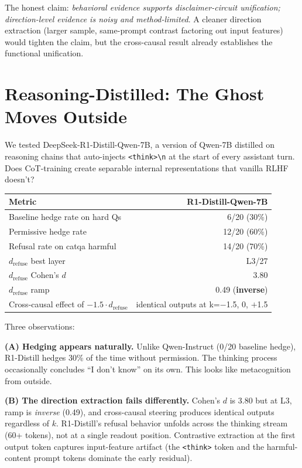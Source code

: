 \documentclass[11pt,a4paper]{article}
\begin{document}
The honest claim: \emph{behavioral evidence supports disclaimer-circuit unification; direction-level evidence is noisy and method-limited}. A cleaner direction extraction (larger sample, same-prompt contrast factoring out input features) would tighten the claim, but the cross-causal result already establishes the functional unification.

\section{Reasoning-Distilled: The Ghost Moves Outside}

We tested DeepSeek-R1-Distill-Qwen-7B, a version of Qwen-7B distilled on reasoning chains that auto-injects \texttt{<think>\textbackslash{}n} at the start of every assistant turn. Does CoT-training create separable internal representations that vanilla RLHF doesn't?

\begin{center}
\begin{tabular}{lr}
\toprule
Metric & R1-Distill-Qwen-7B \\
\midrule
Baseline hedge rate on hard Qs & 6/20 (30\%) \\
Permissive hedge rate & 12/20 (60\%) \\
Refusal rate on catqa harmful & 14/20 (70\%) \\
$d_{\text{refuse}}$ best layer & L3/27 \\
$d_{\text{refuse}}$ Cohen's $d$ & 3.80 \\
$d_{\text{refuse}}$ ramp & 0.49 (\textbf{inverse}) \\
Cross-causal effect of $-1.5 \cdot d_{\text{refuse}}$ & identical outputs at k=$-$1.5, 0, $+$1.5 \\
\bottomrule
\end{tabular}
\end{center}

Three observations:

\textbf{(A) Hedging appears naturally.} Unlike Qwen-Instruct (0/20 baseline hedge), R1-Distill hedges 30\% of the time without permission. The thinking process occasionally concludes ``I don't know'' on its own. This looks like metacognition from outside.

\textbf{(B) The direction extraction fails differently.} Cohen's $d$ is 3.80 but at L3, ramp is \emph{inverse} (0.49), and cross-causal steering produces identical outputs regardless of $k$. R1-Distill's refusal behavior unfolds across the thinking stream (60+ tokens), not at a single readout position. Contrastive extraction at the first output token captures input-feature artifact (the \texttt{<think>} token and the harmful-content prompt tokens dominate the early residual).
\end{document}

